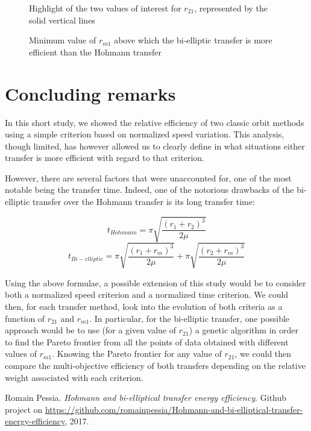 \documentclass[journal]{IEEEtran}
\begin{document}
\begin{figure}[htp!]
  \centering
  
  \caption{Highlight of the two values of interest for $r_{21}$, represented by the solid vertical lines}
  \label{plot:vbar2}
\end{figure}

\begin{figure}[htp!]
  \centering
  
  \caption{Minimum value of $r_{m1}$ above which the bi-elliptic transfer is more efficient than the Hohmann transfer}
  \label{plot:vbar3}
\end{figure}

\section*{Concluding remarks}

In this short study, we showed the relative efficiency of two classic orbit methods using a simple criterion based on normalized speed variation. This analysis, though limited, has however allowed us to clearly define in what situations either transfer is more efficient with regard to that criterion.

However, there are several factors that were unaccounted for, one of the most notable being the transfer time. Indeed, one of the notorious drawbacks of the bi-elliptic transfer over the Hohmann transfer is its long transfer time:

\begin{equation}
    t_{Hohmann}=\pi \sqrt{\frac{(r_1+r_2)^3}{2\mu}}
\end{equation}
\begin{equation}
    t_{Bi-elliptic} = \pi \sqrt{\frac{(r_1+r_m)^3}{2\mu}} + \pi \sqrt{\frac{(r_2+r_m)^3}{2 \mu}}
\end{equation}

Using the above formulae, a possible extension of this study would be to consider both a normalized speed criterion and a normalized time criterion. We could then, for each transfer method, look into the evolution of both criteria as a function of  $r_{21}$ and $r_{m1}$. In particular, for the bi-elliptic transfer, one possible approach would be to use (for a given value of $r_{21}$) a genetic algorithm in order to find the Pareto frontier from all the points of data obtained with different values of $r_{m1}$. Knowing the Pareto frontier for any value of $r_{21}$, we could then compare the multi-objective efficiency of both transfers depending on the relative weight associated with each criterion.

\appendices

\begin{thebibliography}{9}
Romain Pessia. 
\textit{Hohmann and bi-elliptical transfer energy efficiency}. 
Github project on \href{https://github.com/romainpessia/Hohmann-and-bi-elliptical-transfer-energy-efficiency}{https://github.com/romainpessia/Hohmann-and-bi-elliptical-transfer-energy-efficiency}, 2017.
\end{thebibliography}
\end{document}
